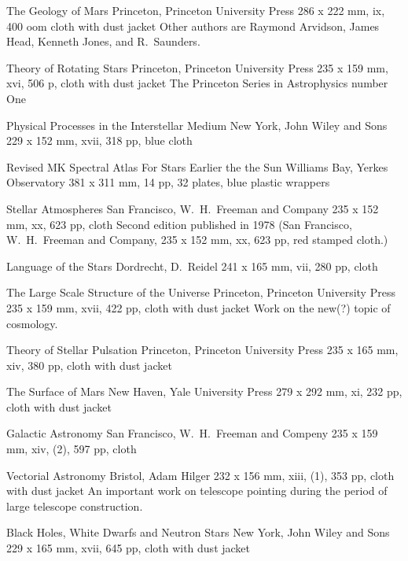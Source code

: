 {The Geology of Mars}
{Princeton, Princeton University Press}
{286 x 222 mm, ix, 400 oom cloth with dust jacket}
{}
Other authors are Raymond Arvidson, James Head, Kenneth Jones,
and R.\ Saunders.

{Theory of Rotating Stars}
{Princeton, Princeton University Press}
{235 x 159 mm, xvi, 506 p, cloth with dust jacket}
{}
The Princeton Series in Astrophysics number One

{Physical Processes in the Interstellar Medium}
{New York, John Wiley and Sons}
{229 x 152 mm, xvii, 318 pp, blue cloth}
{}

{Revised MK Spectral Atlas For Stars Earlier the the Sun}
{Williams Bay, Yerkes Observatory}
{381 x 311 mm, 14 pp, 32 plates, blue plastic wrappers}
{}

{Stellar Atmospheres}
{San Francisco, W.\ H.\ Freeman and Company}
{235 x 152 mm, xx, 623 pp, cloth}
{}
Second edition published in 1978 (San Francisco, W.\ H.\ Freeman and Company,
235 x 152 mm, xx, 623 pp, red stamped cloth.)

{Language of the Stars}
{Dordrecht, D.\ Reidel}
{241 x 165 mm, vii, 280 pp, cloth}
{}

{The Large Scale Structure of the Universe}
{Princeton, Princeton University Press}
{235 x 159 mm, xvii, 422 pp, cloth with dust jacket}
{}
Work on the new(?) topic of cosmology.

{Theory of Stellar Pulsation}
{Princeton, Princeton University Press}
{235 x 165 mm, xiv, 380 pp, cloth with dust jacket}
{}

{The Surface of Mars}
{New Haven, Yale University Press}
{279 x 292 mm, xi, 232 pp, cloth with dust jacket}
{}

{Galactic Astronomy}
{San Francisco, W.\ H.\ Freeman and Compeny}
{235 x 159 mm, xiv, (2), 597 pp, cloth}
{}

{Vectorial Astronomy}
{Bristol, Adam Hilger}
{232 x 156 mm, xiii, (1), 353 pp, cloth with dust jacket}
{}
An important work on telescope pointing during the period
of large telescope construction.

{Black Holes, White Dwarfs and Neutron Stars}
{New York, John Wiley and Sons}
{229 x 165 mm, xvii, 645 pp, cloth with dust jacket}
{}

